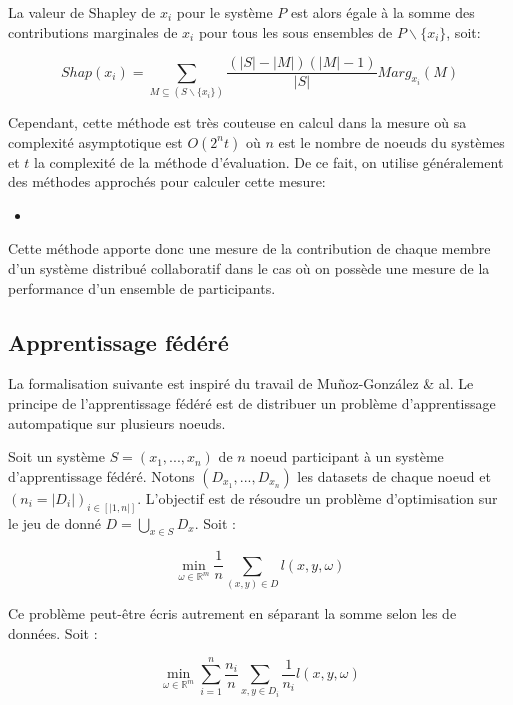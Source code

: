 \documentclass[stage3a]{tnreport} %
\begin{document}
La valeur de Shapley de $x_i$ pour le système $P$ est alors égale à la somme des contributions marginales de $x_i$ pour tous les sous ensembles de $P \backslash \{x_i\}$, soit:

\begin{equation}
  Shap(x_i)=\sum_{M \subseteq (S\backslash \{x_i\})} \frac{(|S|-|M|)(|M|-1)}{|S|}Marg_{x_i}(M)
\end{equation}

Cependant, cette méthode est très couteuse en calcul dans la mesure où sa complexité asymptotique est $O(2^nt) $ où $n$ est le nombre de noeuds du systèmes et $t$ la complexité de la méthode d'évaluation. De ce fait, on utilise généralement des méthodes approchés pour calculer cette mesure:

\begin{itemize}
  \item 
\end{itemize}

Cette méthode apporte donc une mesure de la contribution de chaque membre d'un système distribué collaboratif dans le cas où on possède une mesure de la performance d'un ensemble de participants.

\subsection{Apprentissage fédéré}

La formalisation suivante est inspiré du travail de Muñoz-González \& al. Le principe de l'apprentissage fédéré est de distribuer un problème d'apprentissage autompatique sur plusieurs noeuds. 

Soit un système $S=(x_1,...,x_n)$ de $n$ noeud participant à un système d'apprentissage fédéré. Notons $(D_{x_1},...,D_{x_n})$ les datasets de chaque noeud et $(n_i = |D_i|)_{i\in[|1,n|]}$. L'objectif est de résoudre un problème d'optimisation sur le jeu de donné $D=\bigcup_{x\in S} D_x$. Soit :

\begin{equation}
  \min_{\omega \in \mathbb{R}^m} \frac{1}{n} \sum_{(x,y) \in D} l(x,y,\omega) 
\end{equation}

Ce problème peut-être écris autrement en séparant la somme selon les de données. Soit :

\begin{equation}
  \min_{\omega \in \mathbb{R}^m} \sum_{i = 1}^n \frac{n_i}{n} \sum_{x,y \in D_i}\frac{1}{n_i}l(x,y,\omega) 
\end{equation}
\end{document}
